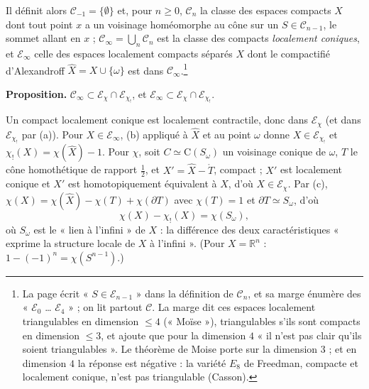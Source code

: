 \documentclass[11pt,a4paper]{article}
\begin{document}
Il définit alors $\mathcal{C}_{-1} = \{\emptyset\}$ et, pour $n \geq 0$,
$\mathcal{C}_n$ la classe des espaces compacts $X$ dont tout point $x$ a un
voisinage homéomorphe au cône sur un $S \in \mathcal{C}_{n-1}$, le sommet
allant en $x$ ; $\mathcal{C}_\infty = \bigcup_n \mathcal{C}_n$ est la classe
des compacts \emph{localement coniques}, et $\mathcal{E}_\infty$ celle des
espaces localement compacts séparés $X$ dont le compactifié d'Alexandroff
$\hat{X} = X \cup \{\omega\}$ est dans $\mathcal{C}_\infty$.\footnote{La page
écrit « $S \in \mathcal{E}_{n-1}$ » dans la définition de $\mathcal{C}_n$, et
sa marge énumère des « $\mathcal{E}_0$ … $\mathcal{E}_4$ » ; on lit partout
$\mathcal{C}$. La marge dit ces espaces localement triangulables en dimension
$\leq 4$ (« Moïse »), triangulables s'ils sont compacts en dimension $\leq 3$,
et ajoute que pour la dimension $4$ « il n'est pas clair qu'ils soient
triangulables ». Le théorème de Moise porte sur la dimension $3$ ; et en
dimension $4$ la réponse est négative : la variété $E_8$ de Freedman, compacte
et localement conique, n'est pas triangulable (Casson).}

\textbf{Proposition.} $\mathcal{C}_\infty \subset \mathcal{E}_\chi \cap
\mathcal{E}_{\chi_!}$, et $\mathcal{E}_\infty \subset \mathcal{E}_\chi \cap
\mathcal{E}_{\chi_!}$.

Un compact localement conique est localement contractile, donc dans
$\mathcal{E}_\chi$ (et dans $\mathcal{E}_{\chi_!}$ par (a)). Pour
$X \in \mathcal{E}_\infty$, (b) appliqué à $\hat{X}$ et au point $\omega$
donne $X \in \mathcal{E}_{\chi_!}$ et $\chi_!(X) = \chi(\hat X) - 1$. Pour
$\chi$, soit $C \simeq \mathrm{C}(S_\omega)$ un voisinage conique de $\omega$,
$T$ le cône homothétique de rapport $\tfrac12$, et $X' = \hat X - \mathring T$,
compact ; $X'$ est localement conique et $X'$ est homotopiquement équivalent
à $X$, d'où $X \in \mathcal{E}_\chi$. Par (c),
$\chi(X) = \chi(\hat{X}) - \chi(T) + \chi(\partial T)$ avec $\chi(T) = 1$ et
$\partial T \simeq S_\omega$, d'où
\[
  \chi(X) - \chi_!(X) = \chi(S_\omega),
\]
où $S_\omega$ est le « lien à l'infini » de $X$ : la différence des deux
caractéristiques « exprime la structure locale de $X$ à l'infini ».
(Pour $X = \mathbb{R}^n$ : $1 - (-1)^n = \chi(S^{n-1})$.)
\end{document}

